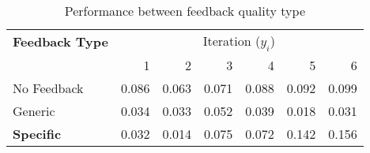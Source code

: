 \begin{table}[!h]
\caption{Performance between feedback quality type}
\label{tab:feedback_type}
\begin{tabular}{l|rrrrrr}
\toprule
\textbf{Feedback Type} & \multicolumn{6}{c}{Iteration ($y_{i}$)} \\
 & 1 & 2 & 3 & 4 & 5 & 6 \\
\midrule
No Feedback & 0.086 & 0.063 & 0.071 & 0.088 & 0.092 & 0.099 \\
Generic & 0.034 & 0.033 & 0.052 & 0.039 & 0.018 & 0.031 \\
\textbf{Specific} & 0.032 & 0.014 & 0.075 & 0.072 & 0.142 & 0.156 \\
\bottomrule
\end{tabular}
\end{table}
